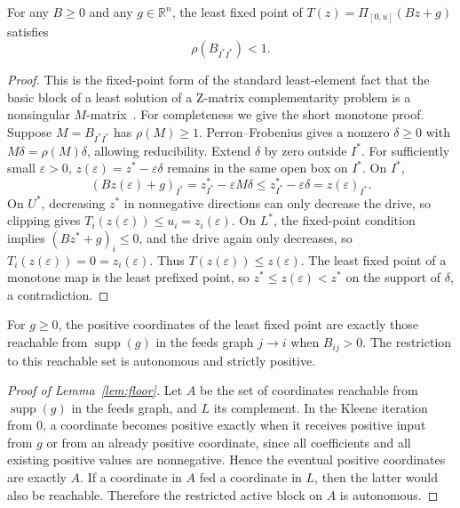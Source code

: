 \documentclass{llncs}
\newcommand{\clip}{\Pi}
\newcommand{\R}{\mathbb{R}}
\begin{document}
\begin{lemma}
\label{lem:lfpsub}
For any \(B\ge0\) and any \(g\in\R^n\), the least fixed point of \(T(z)=\clip_{[0,u]}(Bz+g)\) satisfies
\[
        \rho(B_{I^\ast I^\ast})<1 .
\]
\end{lemma}

\begin{proof}
This is the fixed-point form of the standard least-element fact that the basic block of a least solution of a Z-matrix complementarity problem is a nonsingular \(M\)-matrix~\cite{Chandrasekaran1970,Pang1979,CottlePangStone1992}. For completeness we give the short monotone proof. Suppose \(M=B_{I^\ast I^\ast}\) has \(\rho(M)\ge1\). Perron--Frobenius gives a nonzero \(\delta\ge0\) with \(M\delta=\rho(M)\delta\), allowing reducibility. Extend \(\delta\) by zero outside \(I^\ast\). For sufficiently small \(\varepsilon>0\), \(z(\varepsilon)=z^\ast-\varepsilon\delta\) remains in the same open box on \(I^\ast\). On \(I^\ast\),
\[
        (Bz(\varepsilon)+g)_{I^\ast}
        =z^\ast_{I^\ast}-\varepsilon M\delta
        \le z^\ast_{I^\ast}-\varepsilon\delta
        =z(\varepsilon)_{I^\ast}.
\]
On \(U^\ast\), decreasing \(z^\ast\) in nonnegative directions can only decrease the drive, so clipping gives \(T_i(z(\varepsilon))\le u_i=z_i(\varepsilon)\). On \(L^\ast\), the fixed-point condition implies \((Bz^\ast+g)_i\le0\), and the drive again only decreases, so \(T_i(z(\varepsilon))=0=z_i(\varepsilon)\). Thus \(T(z(\varepsilon))\le z(\varepsilon)\). The least fixed point of a monotone map is the least prefixed point, so \(z^\ast\le z(\varepsilon)<z^\ast\) on the support of \(\delta\), a contradiction.
\end{proof}

\begin{lemma}
\label{lem:floor}
For \(g\ge0\), the positive coordinates of the least fixed point are exactly those reachable from \(\operatorname{supp}(g)\) in the feeds graph \(j\to i\) when \(B_{ij}>0\). The restriction to this reachable set is autonomous and strictly positive.
\end{lemma}

\begin{proof}[Proof of Lemma~\ref{lem:floor}]
Let \(A\) be the set of coordinates reachable from \(\operatorname{supp}(g)\) in the feeds graph, and \(L\) its complement. In the Kleene iteration from \(0\), a coordinate becomes positive exactly when it receives positive input from \(g\) or from an already positive coordinate, since all coefficients and all existing positive values are nonnegative. Hence the eventual positive coordinates are exactly \(A\). If a coordinate in \(A\) fed a coordinate in \(L\), then the latter would also be reachable. Therefore the restricted active block on \(A\) is autonomous.
\end{proof}
\end{document}
